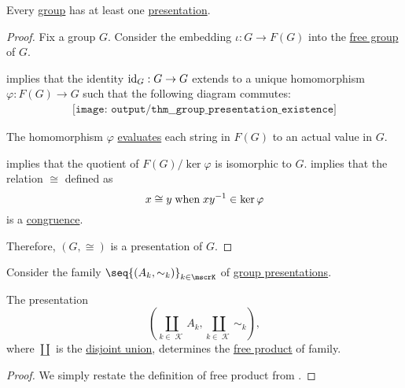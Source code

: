 \begin{proposition}\label{thm:group_presentation_existence}
  Every \hyperref[def:group]{group} has at least one \hyperref[def:group_presentation]{presentation}.
\end{proposition}
\begin{proof}
  Fix a group \( G \). Consider the embedding \( \iota: G \to F(G) \) into the \hyperref[def:free_group]{free group} of \( G \).

   implies that the identity \( {\operatorname{id}_G: G \to G} \) extends to a unique homomorphism \( \varphi: F(G) \to G \) such that the following diagram commutes:
  \begin{equation*}
    \begin{aligned}
      \texttt{[image: output/thm\_\_group\_presentation\_existence]}
    \end{aligned}
  \end{equation*}

  The homomorphism \( \varphi \) \hyperref[con:evaluation_homomorphism]{evaluates} each string in \( F(G) \) to an actual value in \( G \).

   implies that the quotient of \( F(G) / \ker \varphi \) is isomorphic to \( G \).  implies that the relation \( {\cong} \) defined as
  \begin{equation*}
    x \cong y \T{when} xy^{-1} \in \ker \varphi
  \end{equation*}
  is a \hyperref[def:first_order_congruence]{congruence}.

  Therefore, \( (G, \cong) \) is a presentation of \( G \).
\end{proof}

\begin{proposition}\label{thm:free_product_via_presentation}
  Consider the family \( \seq{ (A_k, {\sim_k}) }_{k \in \mscrK} \) of \hyperref[def:group_presentation]{group presentations}.

  The presentation
  \begin{equation*}
    (\coprod_{k \in \mscrK} A_k, \coprod_{k \in \mscrK} {\sim_k}),
  \end{equation*}
  where \( \coprod \) is the \hyperref[def:disjoint_union]{disjoint union}, determines the \hyperref[def:monoid_free_product]{free product} of family.
\end{proposition}
\begin{proof}
  We simply restate the definition of free product from .
\end{proof}

